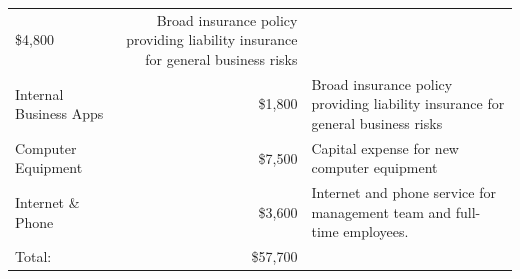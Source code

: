 \documentclass[11pt,openany]{book}
\begin{document}
\begin{longtable}[]{@{}lrl@{}}
\begin{minipage}[t]{0.12\columnwidth}
\$4,800\strut
\end{minipage} & \begin{minipage}[t]{0.48\columnwidth}\raggedright
Broad insurance policy providing liability insurance for general
business risks\strut
\end{minipage}\tabularnewline
\begin{minipage}[t]{0.31\columnwidth}\raggedright
Internal Business Apps\strut
\end{minipage} & \begin{minipage}[t]{0.12\columnwidth}\raggedleft
\$1,800\strut
\end{minipage} & \begin{minipage}[t]{0.48\columnwidth}\raggedright
Broad insurance policy providing liability insurance for general
business risks\strut
\end{minipage}\tabularnewline
\begin{minipage}[t]{0.31\columnwidth}\raggedright
Computer Equipment\strut
\end{minipage} & \begin{minipage}[t]{0.12\columnwidth}\raggedleft
\$7,500\strut
\end{minipage} & \begin{minipage}[t]{0.48\columnwidth}\raggedright
Capital expense for new computer equipment\strut
\end{minipage}\tabularnewline
\begin{minipage}[t]{0.31\columnwidth}\raggedright
Internet \& Phone\strut
\end{minipage} & \begin{minipage}[t]{0.12\columnwidth}\raggedleft
\$3,600\strut
\end{minipage} & \begin{minipage}[t]{0.48\columnwidth}\raggedright
Internet and phone service for management team and full-time
employees.\strut
\end{minipage}\tabularnewline
\begin{minipage}[t]{0.31\columnwidth}\raggedright
Total:\strut
\end{minipage} & \begin{minipage}[t]{0.12\columnwidth}\raggedleft
\$57,700\strut
\end{minipage} & \begin{minipage}[t]{0.48\columnwidth}\raggedright
\strut
\end{minipage}\tabularnewline
\bottomrule
\end{longtable}
\end{document}

